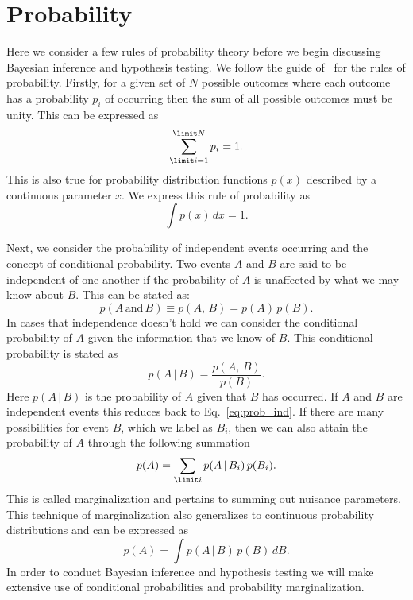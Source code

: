 \section{Probability}\label{sec:probability_basics}
Here we consider a few rules of probability theory before we begin discussing Bayesian inference and hypothesis testing. We follow the guide of~\cite{wall2012practical} for the rules of probability. Firstly, for a given set of $N$ possible outcomes where each outcome has a probability $p_i$ of occurring then the sum of all possible outcomes must be unity. This can be expressed as
\begin{equation}
 \sum_{\limit i=1}^{\limit N} p_i = 1.
\end{equation}
This is also true for probability distribution functions $p(x)$ described by a continuous parameter $x$. We express this rule of probability as
\begin{equation}
 \int p(x) \, dx = 1.
\end{equation}

Next, we consider the probability of independent events occurring and the concept of conditional probability. Two events $A$ and $B$ are said to be independent of one another if the probability of $A$ is unaffected by what we may know about $B$. This can be stated as:
\begin{equation}\label{eq:prob_ind}
 p(A \, \mathrm{and} \, B) \equiv p(A, \, B) = p(A) \, p(B).
\end{equation}
In cases that independence doesn't hold we can consider the conditional probability of $A$ given the information that we know of $B$. This conditional probability is stated as
\begin{equation}
   p(A \, | \, B) = \frac{p(A, \, B)}{p(B)}.
\end{equation}
Here $p(A \, | \, B)$ is the probability of $A$ given that $B$ has occurred. If $A$ and $B$ are independent events this reduces back to Eq.~\ref{eq:prob_ind}. If there are many possibilities for event $B$, which we label as $B_i$, then we can also attain the probability of $A$ through the following summation
\begin{equation}\label{eq:prob_marginalization}
   p(A) = \sum_{\limit i} p(A \, | \, B_i) \, p(B_i).
\end{equation}
This is called marginalization and pertains to summing out nuisance parameters. This technique of marginalization also generalizes to continuous probability distributions and can be expressed as
\begin{equation}
   p(A) = \int p(A \, | \, B) \, p(B) \, dB.
\end{equation}
In order to conduct Bayesian inference and hypothesis testing we will make extensive use of conditional probabilities and probability marginalization.

